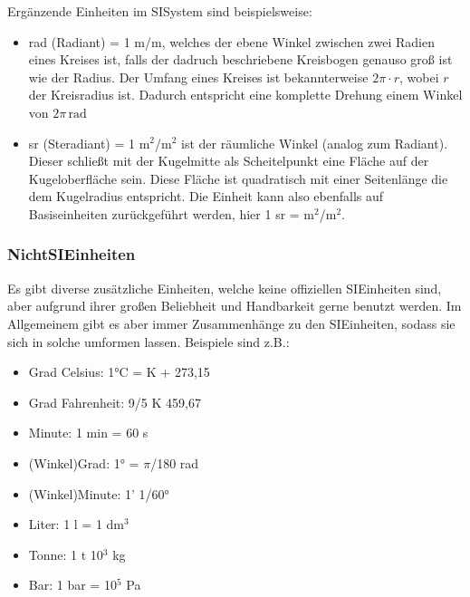 \documentclass[letterpaper,10pt,english]{jupyterBook}
\begin{document}
\sphinxAtStartPar
Ergänzende Einheiten im SI\sphinxhyphen{}System sind beispielsweise:
\begin{itemize}
\item {} 
 rad (Radiant) = 1 m/m, welches der ebene Winkel zwischen zwei Radien eines Kreises ist, falls der dadruch beschriebene Kreisbogen genauso groß ist wie der Radius. Der Umfang eines Kreises ist bekannterweise \(2\pi \cdot r\), wobei \(r\) der Kreisradius ist. Dadurch entspricht eine komplette Drehung einem Winkel von \(2\pi\,\mathrm{rad}\)

\item {} 
 sr (Steradiant) = 1 m\(^2\)/m\(^2\) ist der räumliche Winkel (analog zum Radiant). Dieser schließt mit der Kugelmitte als Scheitelpunkt eine Fläche auf der Kugeloberfläche sein. Diese Fläche ist quadratisch mit einer Seitenlänge die dem Kugelradius entspricht. Die Einheit kann also ebenfalls auf Basiseinheiten zurückgeführt werden, hier 1 sr = m\(^2\)/m\(^2\).

\end{itemize}


\subsubsection{Nicht\sphinxhyphen{}SI\sphinxhyphen{}Einheiten}
\label{\detokenize{content/0_Basics:nicht-si-einheiten}}
\sphinxAtStartPar


\sphinxAtStartPar
Es gibt diverse zusätzliche Einheiten, welche keine offiziellen SI\sphinxhyphen{}Einheiten sind, aber aufgrund ihrer großen Beliebheit und Handbarkeit gerne benutzt werden. Im Allgemeinem gibt es aber immer Zusammenhänge zu den SI\sphinxhyphen{}Einheiten, sodass sie sich in solche umformen lassen. Beispiele sind z.B.:
\begin{itemize}
\item {} 
\sphinxAtStartPar
Grad Celsius: 1°C = K + 273,15

\item {} 
\sphinxAtStartPar
Grad Fahrenheit: 9/5 K \sphinxhyphen{} 459,67

\item {} 
\sphinxAtStartPar
Minute: 1 min = 60 s

\item {} 
\sphinxAtStartPar
(Winkel\sphinxhyphen{})Grad: 1° = \(\pi\)/180 rad

\item {} 
\sphinxAtStartPar
(Winkel\sphinxhyphen{})Minute: 1’  1/60°

\item {} 
\sphinxAtStartPar
Liter: 1 l = 1 dm\(^3\)

\item {} 
\sphinxAtStartPar
Tonne: 1 t  10\(^3\) kg

\item {} 
\sphinxAtStartPar
Bar: 1 bar = 10\(^5\) Pa

\end{itemize}
\end{document}
